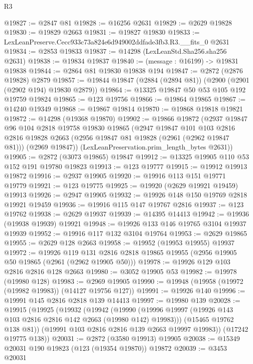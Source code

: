 \begin{lexlean}{R3}
\begin{coremodule}
@19827 := @2847 @81
@19828 := @16256 @2631
@19829 := @2629 @19828
@19830 := @19829 @2663
@19831 := @19827 @19830
@19833 := LexLeanPreserve.Cecc933c73a824e6d949002ddfade3fb3.R3.__fits_0 @2631
@19834 := @2853 @19833
@19837 := @14298 (LexLeanStd.Sha256.sha256 @2631)
@19838 := @19834 @19837
@19840 := (message : @16199) -> @19831 @19838
@19844 := @2864 @81 @19830 @19838 @194
@19847 := @2872 (@2876 @19828) @2879
@19857 := @19844 @19847 (@2884 (@2894 @81)) (@2900 (@2901 (@2902 @194) @19830 @2879))
@19864 := @13325 @19847 @50 @53 @105 @192 @19759 @19824
@19865 := @123 @19756
@19866 := @19864 @19865
@19867 := @14240 @19349
@19868 := @19867 @19814
@19870 := @19868 @19818 @19821
@19872 := @14298 (@19368 @19870)
@19902 := @19866
    @19872
    (@2937
      @19847
      @96
      @104
      @2818
      @19758
      @19830
      @19865
      (@2947
        @19847
        @101
        @103
        @2816
        @2816
        @19828
        @2663
        (@2956 @19847 @81 @19828 (@2961 (@2962 @19847 @81)))
        (@2969 @19847))
      (LexLeanPreservation.prim_length_bytes @2631))
@19905 := @2872 (@3073 @19865) @19847
@19912 := @13325 @19905 @110 @53 @152 @191 @19780 @19823
@19913 := @123 @19777
@19915 := @19912 @19913 @19872
@19916 := @2937 @19905
@19920 := @19916 @113 @151 @19771 @19779
@19921 := @123 @19775
@19925 := @19920 (@2629 @19921 @19459) @19913
@19926 := @2947 @19905
@19932 := @19926 @148 @150 @19769 @2818 @19921 @19459
@19936 := @19916 @115 @147 @19767 @2816
@19937 := @123 @19762
@19938 := @2629 @19937
@19939 := @14395 @14413
@19942 := @19936 (@19938 @19939) @19921
@19948 := @19926 @133 @146 @19765 @3104 @19937 @19939
@19952 := @19916 @117 @132 @3104 @19764
@19953 := @2629 @19865
@19955 := @2629 @128 @2663
@19958 := @19952 (@19953 @19955) @19937
@19972 := @19926
    @119
    @131
    @2816
    @2818
    @19865
    @19955
    (@2956 @19905 @50 @19865 (@2961 (@2962 @19905 @50)))
@19978 := @19926 @129 @103 @2816 @2816 @128 @2663
@19980 := @3052 @19905 @53
@19982 := @19978 (@19980 @128)
@19983 := @2969 @19905
@19990 := @19948 (@19958 (@19972 (@19982 @19983)) (@14127 @19756 @127))
@19991 := @19926 @140
@19996 := @19991 @145 @2816 @2818 @139 @14413
@19997 := @19980 @139
@20028 := @19915
    (@19925
      (@19932
        (@19942
          (@19990 (@19996 @19997 (@19926 @143 @103 @2816 @2816 @142 @2663 (@19980 @142) @19983)))
          (@15465 @19762 @138 @81))
        (@19991 @103 @2816 @2816 @139 @2663 @19997 @19983))
      (@17242 @19775 @138))
@20031 := @2872 (@3580 @19913) @19905
@20038 := @15349 @20031 @190 @19823 (@123 (@19354 @19870)) @19872
@20039 := @3453 @20031

\end{coremodule}
\end{lexlean}
